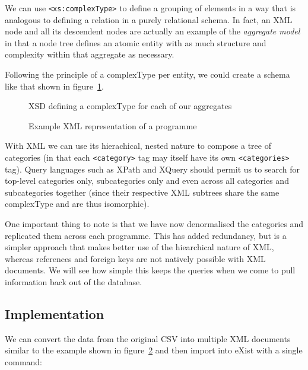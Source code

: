 \documentclass[11pt,a4paper]{article}
\begin{document}
We can use \lstinline|<xs:complexType>| to define a grouping of elements
in a way that is analogous to defining a relation in a purely relational
schema. In fact, an XML node and all its descendent nodes are actually an
example of the \emph{aggregate model} in that a node tree defines an
atomic entity with as much structure and complexity within that
aggregate as necessary.

Following the principle of a complexType per entity, we could create
a schema like that shown in figure~\ref{fig:xsd}.

\begin{figure}[p]
  
  \caption{XSD defining a complexType for each of our aggregates}
  \label{fig:xsd}
\end{figure}

\begin{figure}[p]
  
  \caption{Example XML representation of a programme}
  \label{fig:xml-example}
\end{figure}

With XML we can use its hierachical, nested nature to compose
a tree of categories (in that each \lstinline|<category>| tag may
itself have its own \lstinline|<categories>| tag). Query languages such
as XPath and XQuery should permit us to search for top-level categories
only, subcategories only and even across all categories and subcategories
together (since their respective XML subtrees share the same complexType and
are thus isomorphic).

One important thing to note is that we have now denormalised the
categories and replicated them across each programme. This has
added redundancy, but is a simpler approach that makes better
use of the hiearchical nature of XML, whereas references and foreign
keys are not natively possible with XML documents. We will see how
simple this keeps the queries when we come to pull information back
out of the database.

\subsection{Implementation}

We can convert the data from the original CSV into multiple XML documents
similar to the example shown in figure~\ref{fig:xml-example} and then import
into eXist with a single command:
\end{document}
